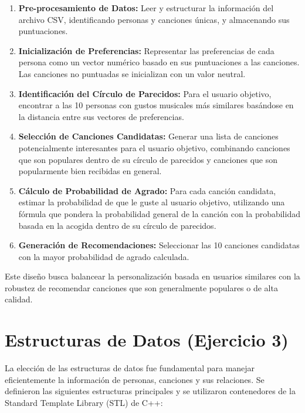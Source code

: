 \documentclass{article}
\begin{document}
\begin{enumerate}[label=\arabic*.] %
    \item \textbf{Pre-procesamiento de Datos:} Leer y estructurar la información del archivo CSV, identificando personas y canciones únicas, y almacenando sus puntuaciones.
    \item \textbf{Inicialización de Preferencias:} Representar las preferencias de cada persona como un vector numérico basado en sus puntuaciones a las canciones. Las canciones no puntuadas se inicializan con un valor neutral.
    \item \textbf{Identificación del Círculo de Parecidos:} Para el usuario objetivo, encontrar a las 10 personas con gustos musicales más similares basándose en la distancia entre sus vectores de preferencias.
    \item \textbf{Selección de Canciones Candidatas:} Generar una lista de canciones potencialmente interesantes para el usuario objetivo, combinando canciones que son populares dentro de su círculo de parecidos y canciones que son popularmente bien recibidas en general.
    \item \textbf{Cálculo de Probabilidad de Agrado:} Para cada canción candidata, estimar la probabilidad de que le guste al usuario objetivo, utilizando una fórmula que pondera la probabilidad general de la canción con la probabilidad basada en la acogida dentro de su círculo de parecidos.
    \item \textbf{Generación de Recomendaciones:} Seleccionar las 10 canciones candidatas con la mayor probabilidad de agrado calculada.
\end{enumerate}

Este diseño busca balancear la personalización basada en usuarios similares con la robustez de recomendar canciones que son generalmente populares o de alta calidad.

\section{Estructuras de Datos (Ejercicio 3)}

La elección de las estructuras de datos fue fundamental para manejar eficientemente la información de personas, canciones y sus relaciones. Se definieron las siguientes estructuras principales y se utilizaron contenedores de la Standard Template Library (STL) de C++:
\end{document}
